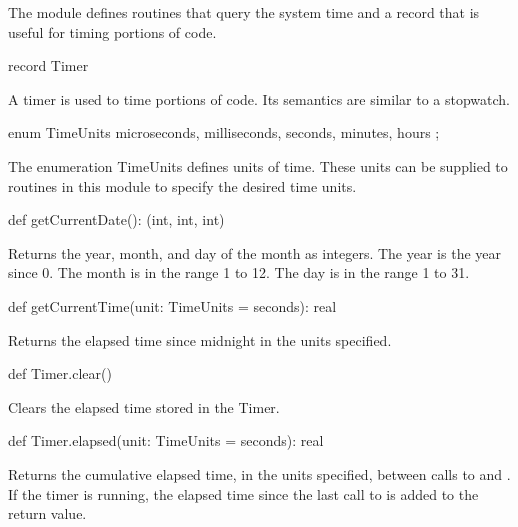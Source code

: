 The module  defines routines that query the system time and
a record  that is useful for timing portions of code.

\vspace{1pc}

\begin{protohead}
record Timer
\end{protohead}
\begin{protobody}
A timer is used to time portions of code.  Its semantics are similar
to a stopwatch.
\end{protobody}

\begin{protohead}
enum TimeUnits { microseconds, milliseconds, seconds, minutes, hours };
\end{protohead}
\begin{protobody}
The enumeration TimeUnits defines units of time.  These units can be
supplied to routines in this module to specify the desired time units.
\end{protobody}

\begin{protohead}
def getCurrentDate(): (int, int, int)
\end{protohead}
\begin{protobody}
Returns the year, month, and day of the month as integers.  The year
is the year since 0.  The month is in the range 1 to 12.  The day is
in the range 1 to 31.
\end{protobody}

\begin{protohead}
def getCurrentTime(unit: TimeUnits = seconds): real
\end{protohead}
\begin{protobody}
Returns the elapsed time since midnight in the units specified.
\end{protobody}

\begin{protohead}
def Timer.clear()
\end{protohead}
\begin{protobody}
Clears the elapsed time stored in the Timer.
\end{protobody}

\begin{protohead}
def Timer.elapsed(unit: TimeUnits = seconds): real
\end{protohead}
\begin{protobody}
Returns the cumulative elapsed time, in the units specified, between
calls to  and .  If the timer is running, the
elapsed time since the last call to  is added to the
return value.
\end{protobody}

